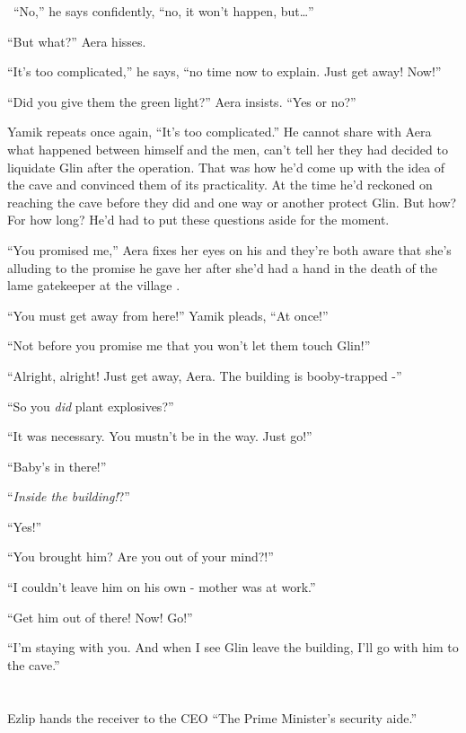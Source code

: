 \documentclass[twoside,11pt]{book}
\begin{document}
\ ``No,'' he says{ }confidently,
``no,{ }it won't happen, but{\dots}''

``But what?'' Aera hisses.

``It's too complicated,'' he says, ``no time now to explain. Just get away!
Now!''

``Did you give them the green light?'' Aera insists. ``Yes or no?''

Yamik repeats once again, ``It's too complicated.'' He
cannot{ }share with Aera what happened between himself and the men, can't tell
her they had decided to liquidate Glin after the operation. That was how he'd come up with the idea of the cave and
convinced them of its practicality. At the time he'd reckoned on reaching the cave before they did and one way or
another protect Glin. But how? For how long? He'd had to put these questions aside for the moment.

``You promised me,'' Aera fixes her eyes on his and they're both aware that she's alluding to
the promise he gave her after she'd had a hand in the death of the lame gatekeeper at the village .

``You must get away from here!'' Yamik pleads, ``At
once!''

``Not before you promise me that you won't let them touch Glin!''

``Alright, alright! Just get away, Aera{. T}he building is
booby-trapped -''

``So you \textit{did}{ }plant explosives?''

``{I}t was{ }necessary. You
mustn't be in the way. Just go!''

``Baby's in there!''

``\textit{Inside the  building!}?''

``Yes!''

``You brought him? Are you out of your mind?!''

``I couldn't leave him on his own {{}-} mother was at
work.''

``Get him out of there! Now! Go!''

``I'm staying with you. And when I see Glin leave the building, I'll go with him to the
cave.''



\chapter{}

Ezlip hands the receiver to the CEO ``The Prime Minister's security aide.''
\end{document}
